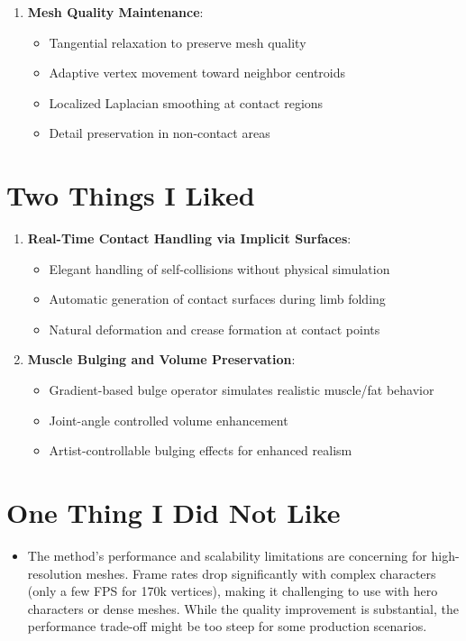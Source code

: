 \documentclass[12pt]{article}
\begin{document}
\begin{enumerate}[noitemsep]
    \item \textbf{Mesh Quality Maintenance}:
    \begin{itemize}[noitemsep]
        \item Tangential relaxation to preserve mesh quality
        \item Adaptive vertex movement toward neighbor centroids
        \item Localized Laplacian smoothing at contact regions
        \item Detail preservation in non-contact areas
    \end{itemize}
\end{enumerate}

\section{Two Things I Liked}
\begin{enumerate}[noitemsep]
    \item \textbf{Real-Time Contact Handling via Implicit Surfaces}:
    \begin{itemize}[noitemsep]
        \item Elegant handling of self-collisions without physical simulation
        \item Automatic generation of contact surfaces during limb folding
        \item Natural deformation and crease formation at contact points
    \end{itemize}
    
    \item \textbf{Muscle Bulging and Volume Preservation}:
    \begin{itemize}[noitemsep]
        \item Gradient-based bulge operator simulates realistic muscle/fat behavior
        \item Joint-angle controlled volume enhancement
        \item Artist-controllable bulging effects for enhanced realism
    \end{itemize}
\end{enumerate}

\section{One Thing I Did Not Like}
\begin{itemize}[noitemsep]
    \item The method's performance and scalability limitations are concerning for high-resolution meshes. Frame rates drop significantly with complex characters (only a few FPS for 170k vertices), making it challenging to use with hero characters or dense meshes. While the quality improvement is substantial, the performance trade-off might be too steep for some production scenarios.
\end{itemize}
\end{document}
